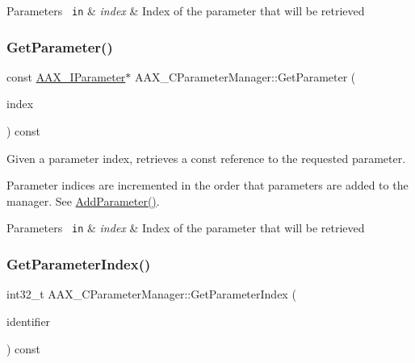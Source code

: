 \begin{DoxyParams}[1]{Parameters}
\mbox{\texttt{ in}}  & {\em index} & Index of the parameter that will be retrieved \\
\hline
\end{DoxyParams}
\mbox{\label{a01545_a473f13ba70dd8860e573bcf850fa7e05}} 
\subsubsection{\texorpdfstring{GetParameter()}{GetParameter()}\hspace{0.1cm}{\footnotesize\ttfamily [2/2]}}
{\footnotesize\ttfamily const \mbox{\hyperlink{a01857}{A\+A\+X\+\_\+\+I\+Parameter}}$\ast$ A\+A\+X\+\_\+\+C\+Parameter\+Manager\+::\+Get\+Parameter (\begin{DoxyParamCaption}\item[{int32\+\_\+t}]{index }\end{DoxyParamCaption}) const}



Given a parameter index, retrieves a const reference to the requested parameter. 

Parameter indices are incremented in the order that parameters are added to the manager. See \mbox{\hyperlink{a01545_ae2f9631b33c012f7a8c042df9655b28c}{Add\+Parameter()}}.


\begin{DoxyParams}[1]{Parameters}
\mbox{\texttt{ in}}  & {\em index} & Index of the parameter that will be retrieved \\
\hline
\end{DoxyParams}
\mbox{\label{a01545_ad4322f62f0ea9c9481979db4792715be}} 
\subsubsection{\texorpdfstring{GetParameterIndex()}{GetParameterIndex()}}
{\footnotesize\ttfamily int32\+\_\+t A\+A\+X\+\_\+\+C\+Parameter\+Manager\+::\+Get\+Parameter\+Index (\begin{DoxyParamCaption}\item[{\mbox{\hyperlink{a00392_a1440c756fe5cb158b78193b2fc1780d1}{A\+A\+X\+\_\+\+C\+Param\+ID}}}]{identifier }\end{DoxyParamCaption}) const}

